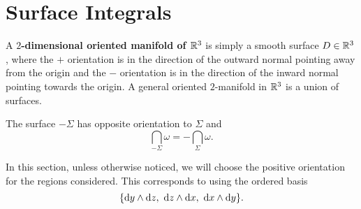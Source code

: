 \section{Surface Integrals}
\begin{df}
A  \textbf{$2$-dimensional  oriented manifold of $\mathbb{R}^3$} is simply
a smooth surface $D\in \mathbb{R}^3$, where the $+$ orientation is in
the direction of the outward normal pointing away from the origin
and the $-$ orientation is in the direction of the inward normal
pointing towards the origin. A general oriented $2$-manifold in
$\mathbb{R}^3$ is a union of surfaces.
\end{df}
\begin{rem}The surface $-\Sigma$ has opposite orientation to $\Sigma$ and
$$ \dint _{-\Sigma} \omega = -\dint _\Sigma \omega .   $$
\end{rem}

\begin{rem}
In this section, unless otherwise noticed, we will choose the
positive orientation for the regions considered. This corresponds
to using the ordered basis  $$\{\d{y}\wedge \d{z}, \
\d{z}\wedge\d{x}, \ \d{x}\wedge\d{y}\}.$$
\end{rem}

